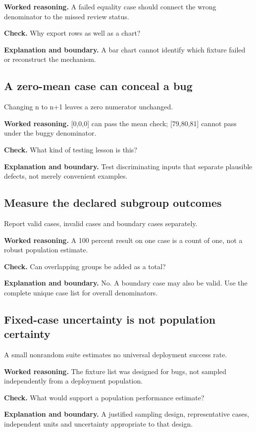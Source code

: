 \textbf{Worked reasoning.} A failed equality case should connect the wrong denominator to the missed review status.

\textbf{Check.} Why export rows as well as a chart?

\textbf{Explanation and boundary.} A bar chart cannot identify which fixture failed or reconstruct the mechanism.

\subsection{A zero-mean case can conceal a bug}
Changing n to n+1 leaves a zero numerator unchanged.

\textbf{Worked reasoning.} [0,0,0] can pass the mean check; [79,80,81] cannot pass under the buggy denominator.

\textbf{Check.} What kind of testing lesson is this?

\textbf{Explanation and boundary.} Test discriminating inputs that separate plausible defects, not merely convenient examples.

\subsection{Measure the declared subgroup outcomes}
Report valid cases, invalid cases and boundary cases separately.

\textbf{Worked reasoning.} A 100 percent result on one case is a count of one, not a robust population estimate.

\textbf{Check.} Can overlapping groups be added as a total?

\textbf{Explanation and boundary.} No. A boundary case may also be valid. Use the complete unique case list for overall denominators.

\subsection{Fixed-case uncertainty is not population certainty}
A small nonrandom suite estimates no universal deployment success rate.

\textbf{Worked reasoning.} The fixture list was designed for bugs, not sampled independently from a deployment population.

\textbf{Check.} What would support a population performance estimate?

\textbf{Explanation and boundary.} A justified sampling design, representative cases, independent units and uncertainty appropriate to that design.

